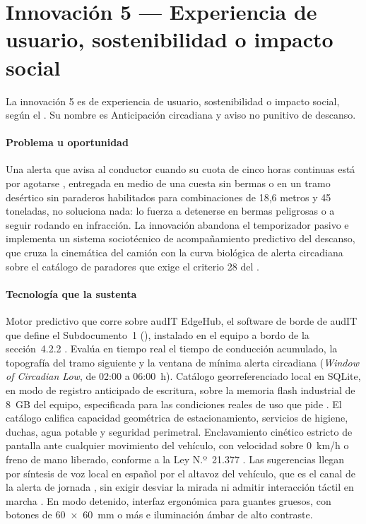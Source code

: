 \section{Innovación 5 — Experiencia de usuario, sostenibilidad o impacto social}\label{sec:13-innovacion-5}

La innovación 5 es de experiencia de usuario, sostenibilidad o impacto social, según el .
Su nombre es Anticipación circadiana y aviso no punitivo de descanso.

\paragraph{Problema u oportunidad} Una alerta que avisa al conductor cuando su cuota de cinco horas
continuas está por agotarse \parencite{codigo_trabajo_25bis}, entregada en medio de una cuesta sin
bermas o en un tramo desértico sin paraderos habilitados para combinaciones de 18,6 metros y 45
toneladas, no soluciona nada: lo fuerza a detenerse en bermas peligrosas o a seguir rodando en
infracción. La innovación abandona el temporizador pasivo e implementa un sistema sociotécnico de
acompañamiento predictivo del descanso, que cruza la cinemática del camión con la curva biológica de
alerta circadiana sobre el catálogo de paradores que exige el criterio 28 del .

\paragraph{Tecnología que la sustenta} Motor predictivo que corre sobre audIT EdgeHub, el software
de borde de audIT que define el Subdocumento~1 (), instalado en el equipo a bordo de la sección~4.2.2 . Evalúa en tiempo real el tiempo de conducción acumulado, la
topografía del tramo siguiente y la ventana de mínima alerta circadiana (\emph{Window of Circadian
Low}, de 02:00 a 06:00~h). Catálogo georreferenciado local en SQLite, en modo de registro anticipado de escritura, sobre la
memoria flash industrial de 8~GB del equipo, especificada para las condiciones reales de uso que pide
. El catálogo califica
capacidad geométrica de estacionamiento, servicios de higiene, duchas, agua potable y seguridad
perimetral. Enclavamiento cinético estricto de pantalla ante cualquier movimiento del vehículo, con
velocidad sobre 0~km/h o freno de mano liberado, conforme a la Ley N.º~21.377 \parencite{ley21377}.
Las sugerencias llegan por síntesis de voz local en español por el altavoz del vehículo, que es el
canal de la alerta de jornada , sin exigir desviar la mirada ni admitir
interacción táctil en marcha . En modo detenido, interfaz ergonómica para guantes gruesos, con botones
de 60~×~60~mm o más e iluminación ámbar de alto contraste.

